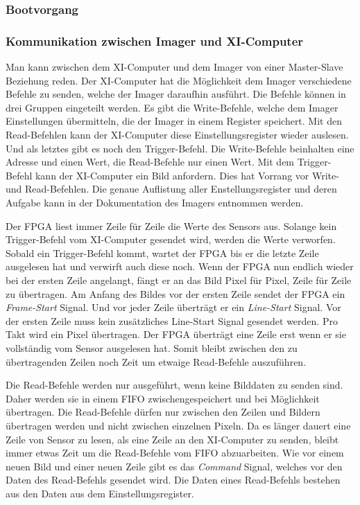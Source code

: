 \documentclass{article}
\begin{document}
\subsubsection*{Bootvorgang}


\subsubsection*{Kommunikation zwischen Imager und XI-Computer}

Man kann zwischen dem XI-Computer und dem Imager von einer Master-Slave Beziehung reden. Der XI-Computer hat die Möglichkeit dem Imager verschiedene Befehle zu senden, welche der Imager daraufhin ausführt. Die Befehle können in drei Gruppen eingeteilt werden. Es gibt die Write-Befehle, welche dem Imager Einstellungen übermitteln, die der Imager in einem Register speichert. Mit den Read-Befehlen kann der XI-Computer diese Einstellungsregister wieder auslesen. Und als letztes gibt es noch den Trigger-Befehl. Die Write-Befehle beinhalten eine Adresse und einen Wert, die Read-Befehle nur einen Wert. Mit dem Trigger-Befehl kann der XI-Computer ein Bild anfordern. Dies hat Vorrang vor Write- und Read-Befehlen. Die genaue Auflistung aller Enstellungsregister und deren Aufgabe kann in der Dokumentation des Imagers entnommen werden. 

Der FPGA liest immer Zeile für Zeile die Werte des Sensors aus. Solange kein Trigger-Befehl vom XI-Computer gesendet wird, werden die Werte verworfen. Sobald ein Trigger-Befehl kommt, wartet der FPGA bis er die letzte Zeile ausgelesen hat und verwirft auch diese noch. Wenn der FPGA nun endlich wieder bei der ersten Zeile angelangt, fängt er an das Bild Pixel für Pixel, Zeile für Zeile zu übertragen. Am Anfang des Bildes vor der ersten Zeile sendet der FPGA ein \textit{Frame-Start} Signal. Und vor jeder Zeile überträgt er ein \textit{Line-Start} Signal. Vor der ersten Zeile muss kein zusätzliches Line-Start Signal gesendet werden. Pro Takt wird ein Pixel übertragen. Der FPGA überträgt eine Zeile erst wenn er sie vollständig vom Sensor ausgelesen hat. Somit bleibt zwischen den zu übertragenden Zeilen noch Zeit um etwaige Read-Befehle auszuführen.

Die Read-Befehle werden nur ausgeführt, wenn keine Bilddaten zu senden sind. Daher werden sie in einem FIFO zwischengespeichert und bei Möglichkeit übertragen. Die Read-Befehle dürfen nur zwischen den Zeilen und Bildern übertragen werden und nicht zwischen einzelnen Pixeln. Da es länger dauert eine Zeile von Sensor zu lesen, als eine Zeile an den XI-Computer zu senden, bleibt immer etwas Zeit um die Read-Befehle vom FIFO abzuarbeiten. Wie vor einem neuen Bild und einer neuen Zeile gibt es das \textit{Command} Signal, welches vor den Daten des Read-Befehls gesendet wird. Die Daten eines Read-Befehls bestehen aus den Daten aus dem Einstellungsregister.
\end{document}
